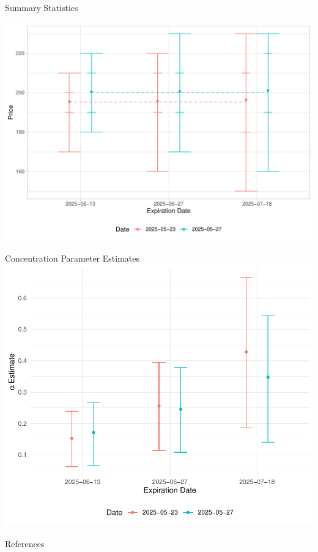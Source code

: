 \documentclass[10pt,aspectratio=43]{beamer}
\begin{document}
\begin{frame}{Summary Statistics}
    \begin{center}
        \includegraphics[width=0.9\linewidth]{summaries_plot.pdf}
    \end{center}
\end{frame}


\begin{frame}{Concentration Parameter Estimates}
    \centering
    \includegraphics[scale=0.6]{alphas.pdf}
\end{frame}




\lastslide

\begin{frame}[allowframebreaks]{References}
    \renewcommand*{\bibfont}{\scriptsize}
    \printbibliography
\end{frame}


    
\end{document}
